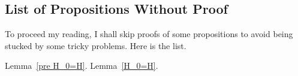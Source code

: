 \subsection*{List of Propositions Without Proof}
To proceed my reading, I shall skip proofs of some propositions to avoid being stucked by some tricky problems.
Here is the list.

Lemma~\ref{pre H_0=H}.
Lemma~\ref{H_0=H}.